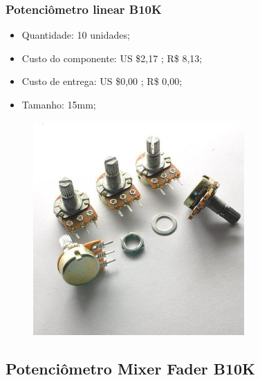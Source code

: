 \documentclass[hyperref={pdfpagelabels=false}]{beamer}
\begin{document}
   	        \begin{frame}\frametitle{Potenciômetro linear B10K}

      	          \begin{itemize}
           	          \item Quantidade: 10 unidades;
            	      \item Custo do componente: US \$2,17 ; R\$ 8,13;
        	          \item Custo de entrega: US \$0,00 ; R\$ 0,00;
        	          \item Tamanho: 15mm;
         	      \end{itemize}

	              \begin{figure}
         	          \includegraphics[scale=0.5]{Imagens/Apresentacao_2/potenciometro.png}
    	       	  \end{figure}	

   	     \end{frame}

        \subsection{Potenciômetro Mixer Fader B10K}
\end{document}
